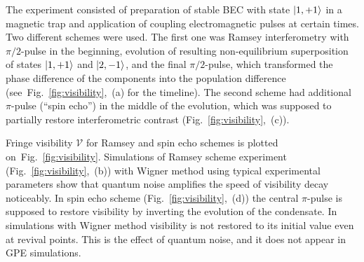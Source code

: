 \documentclass[aps,prl,twocolumn,showpacs,amsmath,amssymb,superscriptaddress]{revtex4-1}
\newcommand{\figref}[1]{Fig.~\ref{#1}}
\newcommand{\ket}[1]{\mbox{\ensuremath{| #1 \rangle}}}
\begin{document}
The experiment consisted of preparation of stable BEC with state $\ket{1,+1}$ in a magnetic trap
and application of coupling electromagnetic pulses at certain times.
Two different schemes were used.
The first one was Ramsey interferometry with $\pi/2$-pulse in the beginning,
evolution of resulting non-equilibrium superposition of states $\ket{1,+1}$ and $\ket{2,-1}$,
and the final $\pi/2$-pulse, which transformed the phase difference of the components
into the population difference (see~\figref{fig:visibility},~(a) for the timeline).
The second scheme had additional $\pi$-pulse (``spin echo'') in the middle of the evolution,
which was supposed to partially restore interferometric contrast
(\figref{fig:visibility},~(c)).

Fringe visibility $\mathcal{V}$ for Ramsey and spin echo schemes is plotted on~\figref{fig:visibility}.
Simulations of Ramsey scheme experiment (\figref{fig:visibility},~(b)) with Wigner method
using typical experimental parameters
show that quantum noise amplifies the speed of visibility decay noticeably.
In spin echo scheme (\figref{fig:visibility},~(d)) the central $\pi$-pulse is supposed
to restore visibility by inverting the evolution of the condensate.
In simulations with Wigner method visibility is not restored to its initial value even at revival points.
This is the effect of quantum noise, and it does not appear in GPE simulations.
\end{document}
